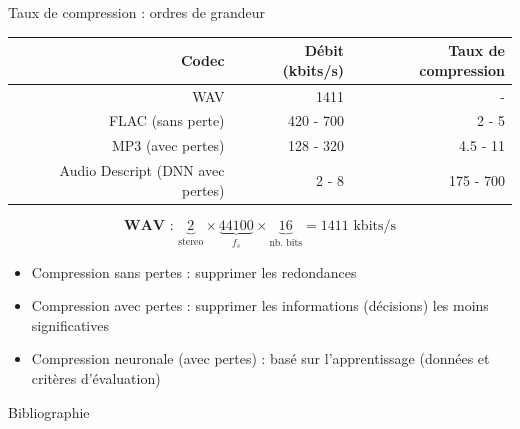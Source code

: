 \documentclass[9pt, aspectratio=169]{beamer}
\begin{document}
\begin{frame}{} %
\begin{center}
\Huge \insertsection
\end{center}
\end{frame}


\begin{frame}{Taux de compression : ordres de grandeur} %

\begin{tabular}{r|rr}
Codec & Débit (kbits/s) & Taux de compression \\
\hline
WAV 				& 1411 & - \\
FLAC (sans perte) 	& 420 - 700 & 2 - 5 \\
MP3 (avec pertes) 	& 128 - 320 &  4.5 - 11 \\
Audio Descript (DNN avec pertes) & 2 - 8 & 175 - 700 \\

\end{tabular}
\begin{equation*}
\textbf{WAV : } \underbrace{2}_\text{stereo} \times \underbrace{44100}_{f_s} \times \underbrace{16}_\text{nb. bits} = 1411 \text{ kbits/s}
\end{equation*}

\pause
\begin{itemize}
	\item Compression sans pertes : supprimer les redondances
	\item Compression avec pertes : supprimer les informations (décisions) les moins significatives
	\item Compression neuronale (avec pertes) : basé sur l'apprentissage (données et critères d'évaluation)
\end{itemize}

\end{frame}

\appendix
\begin{withoutheadline}
\begin{frame}[allowframebreaks]{Bibliographie}
	\fontsize{5pt}{5pt}\selectfont
	
	
\end{frame}
\end{withoutheadline}
\end{document}
